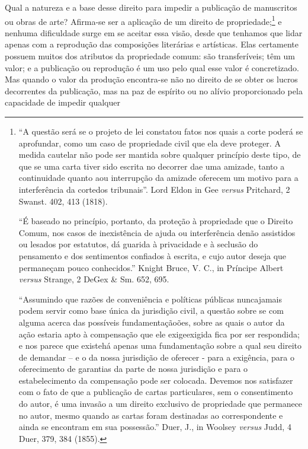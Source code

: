 Qual a natureza e a base desse direito para impedir a publicação de
manuscritos ou obras de arte? Afirma-se ser a aplicação de um direito de
propriedade;\footnote{``A questão será se o projeto de lei constatou
  fatos nos quais a corte poderá se aprofundar, como um caso de
  propriedade civil que ela deve proteger. A medida cautelar não pode
  ser mantida sobre qualquer princípio deste tipo, de que se uma carta
  tiver sido escrita no decorrer dae uma amizade, tanto a continuidade
  quanto aou interrupção da amizade oferecem um motivo para a
  interferência da cortedos tribunais''. Lord Eldon in Gee \emph{versus}
  Pritchard, 2 Swanst. 402, 413 (1818).

  ``É baseado no princípio, portanto, da proteção à propriedade que o
  Direito Comum, nos casos de inexistência de ajuda ou interferência
  denão assistidos ou lesados por estatutos, dá guarida à privacidade e
  à seclusão do pensamento e dos sentimentos confiados à escrita, e cujo
  autor deseja que permaneçam pouco conhecidos.'' Knight Bruce, V. C.,
  in Príncipe Albert \emph{versus} Strange, 2 DeGex \& Sm. 652, 695.

  ``Assumindo que razões de conveniência e políticas públicas
  nuncajamais podem servir como base única da jurisdição civil, a
  questão sobre se com alguma acerca das possíveis fundamentaçãoões,
  sobre as quais o autor da ação estaria apto à compensação que ele
  exigeexigida fica por ser respondida; e nos parece que existehá apenas
  uma fundamentação sobre a qual seu direito de demandar -- e o da nossa
  jurisdição de oferecer - para a exigência, para o oferecimento de
  garantias da parte de nossa jurisdição e para o estabelecimento da
  compensação pode ser colocada. Devemos nos satisfazer com o fato de
  que a publicação de cartas particulares, sem o consentimento do autor,
  é uma invasão a um direito exclusivo de propriedade que permanece no
  autor, mesmo quando as cartas foram destinadas ao correspondente e
  ainda se encontram em sua possessão.'' Duer, J., in Woolsey
  \emph{versus} Judd, 4 Duer, 379, 384 (1855).} e nenhuma dificuldade
surge em se aceitar essa visão, desde que tenhamos que lidar apenas com
a reprodução das composições literárias e artísticas. Elas certamente
possuem muitos dos atributos da propriedade comum: são transferíveis;
têm um valor; e a publicação ou reprodução é um uso pelo qual esse valor
é concretizado. Mas quando o valor da produção encontra-se não no
direito de se obter os lucros decorrentes da publicação, mas na paz de
espírito ou no alívio proporcionado pela capacidade de impedir qualquer
